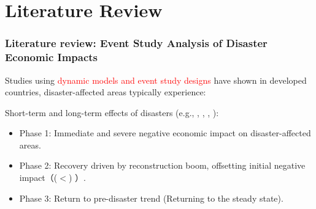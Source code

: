 \documentclass[serif, aspectratio=169]{beamer}
\begin{document}
\section{Literature Review}

\begin{frame}[label=literature_review1]
\frametitle{Literature review: Event Study Analysis of Disaster Economic Impacts}

\vspace{-0.25cm}

Studies using \textcolor{red}{dynamic models and event study designs} have shown \textcolor{the J-curve} in developed countries, disaster-affected areas typically experience: 

    \begin{minipage}[c]{0.4\linewidth}
        \small

        \vspace{-3.1cm}
        
Short-term and long-term effects of disasters (e.g., \citet{Deryugina2018TheReturns}, \citet{Canessa2021WomensShocks}, \citet{Kahraman2023AEarthquake}, \citet{Porcelli2019TheItaly}): 
\begin{itemize}
    \item Phase 1: Immediate and severe negative economic impact on disaster-affected areas.
    \item Phase 2: Recovery driven by reconstruction boom, offsetting initial negative impact（($<$) ）.
    \item Phase 3: Return to pre-disaster trend (Returning to the steady state).
\end{itemize}

        \vspace{-3.0cm}
        


\end{minipage}
\end{frame}
\end{document}
